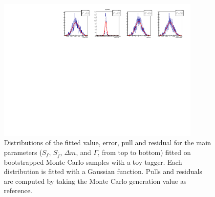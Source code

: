 \begin{figure}[t]
\begin{center}
                \includegraphics[width=0.9\textwidth]{AA-Appdx-toytagger/figs/1DPullPlot_Gamma_SSbarAccAsymmFloatDMGammaConstrAllSamplesToyTagger.pdf}
        \end{center}
        \vspace{-2mm}
        \caption{Distributions of the fitted value, error, pull and residual for the main parameters ($S_f$, $S_{\bar f}$, $\Delta m$, and $\Gamma$, from top to bottom) fitted on bootstrapped Monte Carlo samples with a toy tagger. Each distribution is fitted with a Gaussian function. Pulls and residuals are computed by taking the Monte Carlo generation value as reference.}
        \label{fig:mc_bootstrap_decay_toytagger}
\end{figure}
